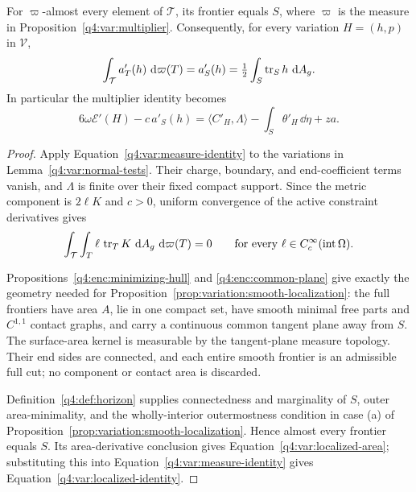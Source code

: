 \begin{proposition}
\label{q4:var:area-localization}
For $\varpi$-almost every element of $\mathcal T$, its frontier equals $S$,
where $\varpi$ is the measure in Proposition~\ref{q4:var:multiplier}.
Consequently, for every variation $H=(h,p)$ in $\mathcal V$,
\begin{equation}
 \int_{\mathcal T}a'_T(h)\,\,\mathrm d\varpi(T)
       =a'_S(h)=\tfrac12\int_S\operatorname{tr}_S h\,\,\mathrm d A_g.
\label{q4:var:localized-area}
\end{equation}
In particular the multiplier identity becomes
\begin{equation}
 6\omega\mathcal E'(H)-c\,a'_S(h)
  =\langle C'_H,\Lambda\rangle
       -\int_S\theta'_H\,\dd\eta+za.
\label{q4:var:localized-identity}
\end{equation}
\end{proposition}

\begin{proof}
Apply Equation~\eqref{q4:var:measure-identity} to the variations in
Lemma~\ref{q4:var:normal-tests}. Their charge, boundary, and end-coefficient
terms vanish, and $\Lambda$ is finite over their fixed compact support.
Since the metric component is $2\ell K$ and $c>0$, uniform convergence
of the active constraint derivatives gives
\begin{equation}
 \int_{\mathcal T}\int_T\ell\,\operatorname{tr}_T K\,\,\mathrm d A_g\,\,\mathrm d\varpi(T)=0
 \qquad\text{for every }\ell\in C^\infty_c(\operatorname{int}\Omega).
\label{q4:var:trace-test}
\end{equation}

Propositions~\ref{q4:enc:minimizing-hull} and
\ref{q4:enc:common-plane} give exactly the geometry needed for
Proposition~\ref{prop:variation:smooth-localization}: the full frontiers
have area $A$, lie in one compact set, have smooth minimal free parts
and $C^{1,1}$ contact graphs, and carry a continuous common tangent
plane away from $S$. The surface-area kernel is measurable by the
tangent-plane measure topology. Their end sides are connected, and
each entire smooth frontier is an admissible full cut; no component or
contact area is discarded.

Definition~\ref{q4:def:horizon} supplies connectedness and marginality of
$S$, outer area-minimality, and the wholly-interior outermostness
condition in case \textup{(a)} of
Proposition~\ref{prop:variation:smooth-localization}. Hence almost every
frontier equals $S$. Its area-derivative conclusion gives
Equation~\eqref{q4:var:localized-area}; substituting this into
Equation~\eqref{q4:var:measure-identity} gives
Equation~\eqref{q4:var:localized-identity}.
\end{proof}

